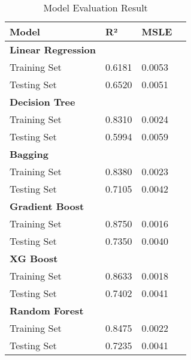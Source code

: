 \documentclass[conference]{IEEEtran}
\begin{document}
    \begin{table}[h]
        \centering
        \renewcommand{\arraystretch}{1.1}
        \begin{tabular}{
            | p{}
            | p{} 
            | p{} |
            | p{}
            }
            \hline
            \textbf{Model} & \textbf{R²} & \textbf{MSLE} \\
            \hline
            \multicolumn{1}{|l}{\textbf{Linear Regression}} \\
            \hline
            Training Set   & 0.6181 & 0.0053 \\
            \hline
            Testing Set & 0.6520 & 0.0051 \\
            \hline
            \multicolumn{1}{|l}{\textbf{Decision Tree}}\\
            \hline
            Training Set & 0.8310 & 0.0024 \\
            \hline
            Testing Set & 0.5994 & 0.0059 \\
            \hline
            \multicolumn{1}{|l}{\textbf{Bagging}} \\
            \hline
            Training Set & 0.8380 & 0.0023 \\
            \hline
            Testing Set & 0.7105 & 0.0042 \\
            \hline
            \multicolumn{1}{|l}{\textbf{Gradient Boost}}\\
            \hline
            Training Set & 0.8750 & 0.0016 \\
            \hline
            Testing Set & 0.7350 & 0.0040 \\
            \hline
            \multicolumn{1}{|l}{\textbf{XG Boost}}\\
            \hline
            Training Set & 0.8633 & 0.0018 \\
            \hline
            Testing Set & 0.7402 & 0.0041 \\
            \hline
            \multicolumn{1}{|l}{\textbf{Random Forest}}\\
            \hline
            Training Set & 0.8475 & 0.0022 \\
            \hline
            Testing Set & 0.7235 & 0.0041 \\
            \hline
        \end{tabular}
    \caption{Model Evaluation Result}
    \end{table}
    
\end{document}
